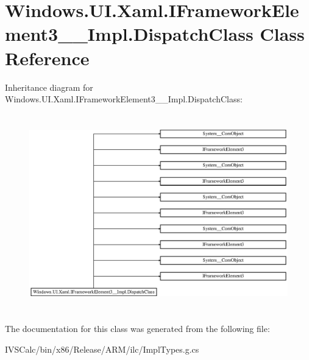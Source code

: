 \hypertarget{class_windows_1_1_u_i_1_1_xaml_1_1_i_framework_element3_____impl_1_1_dispatch_class}{}\section{Windows.\+U\+I.\+Xaml.\+I\+Framework\+Element3\+\_\+\+\_\+\+Impl.\+Dispatch\+Class Class Reference}
\label{class_windows_1_1_u_i_1_1_xaml_1_1_i_framework_element3_____impl_1_1_dispatch_class}
Inheritance diagram for Windows.\+U\+I.\+Xaml.\+I\+Framework\+Element3\+\_\+\+\_\+\+Impl.\+Dispatch\+Class\+:\begin{figure}[H]
\begin{center}
\leavevmode
\includegraphics[height=8.603352cm]{class_windows_1_1_u_i_1_1_xaml_1_1_i_framework_element3_____impl_1_1_dispatch_class}
\end{center}
\end{figure}


The documentation for this class was generated from the following file\+:\begin{DoxyCompactItemize}
\item 
I\+V\+S\+Calc/bin/x86/\+Release/\+A\+R\+M/ilc/Impl\+Types.\+g.\+cs\end{DoxyCompactItemize}
